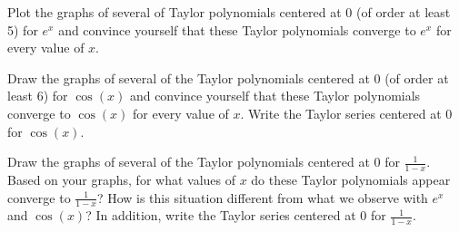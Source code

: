 \begin{activity} \label{8.5.Act3}
\ba
\item Plot the graphs of several of Taylor polynomials centered at 0 (of order at least 5) for $e^x$ and convince yourself that these Taylor polynomials converge to $e^x$ for every value of $x$.
\item Draw the graphs of several of the Taylor polynomials centered at 0 (of order at least 6) for $\cos(x)$ and convince yourself that these Taylor polynomials converge to $\cos(x)$ for every value of $x$. Write the Taylor series centered at 0 for $\cos(x)$.
\item Draw the graphs of several of the Taylor polynomials centered at 0 for $\frac{1}{1-x}$. Based on your graphs, for what values of $x$  do these Taylor polynomials appear converge to $\frac{1}{1-x}$? How is this situation different from what we observe with $e^x$ and $\cos(x)$?  In addition, write the Taylor series centered at 0 for $\frac{1}{1-x}$.
\ea


\end{activity}

